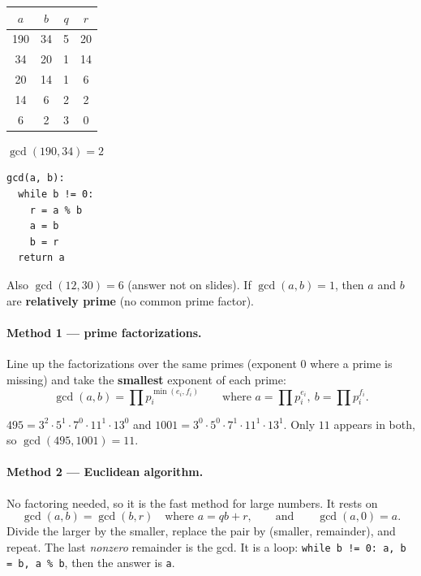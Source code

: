 \documentclass{fkt-notes}
\theoremstyle{definition}
\begin{document}
\begin{keybox}[title=Euclidean algorithm]
  \begin{minipage}[t]{0.52\linewidth}
    \begin{tabular}[t]{@{}cccc@{}}
      \toprule
      $a$ & $b$ & $q$ & $r$ \\\midrule
      190 & 34  & 5   & 20  \\
      34  & 20  & 1   & 14  \\
      20  & 14  & 1   & 6   \\
      14  & 6   & 2   & 2   \\
      6   & 2   & 3   & 0   \\\bottomrule
    \end{tabular}
    \quad $\gcd(190,34)=2$
  \end{minipage}\hfill
  \begin{minipage}[t]{0.40\linewidth}
    \begin{lstlisting}[numbers=none,frame=none]
gcd(a, b):
  while b != 0:
    r = a % b
    a = b
    b = r
  return a
\end{lstlisting}
  \end{minipage}
\end{keybox}
Also $\gcd(12,30)=6$ (answer not on slides).
If $\gcd(a,b)=1$, then $a$ and $b$ are \textbf{relatively prime} (no common prime factor).%

\paragraph{Method 1 --- prime factorizations.} Line up the factorizations
over the same primes (exponent $0$ where a prime is missing) and take the
\textbf{smallest} exponent of each prime:
\[
  \gcd(a, b) = \prod p_i^{\min(e_i, f_i)}
  \qquad \text{where } a = \prod p_i^{e_i},\ b = \prod p_i^{f_i}.
\]

\begin{example}
  $495 = 3^2 \cdot 5^1 \cdot 7^0 \cdot 11^1 \cdot 13^0$ and
  $1001 = 3^0 \cdot 5^0 \cdot 7^1 \cdot 11^1 \cdot 13^1$.
  Only $11$ appears in both, so $\gcd(495, 1001) = 11$.
\end{example}

\paragraph{Method 2 --- Euclidean algorithm.} No factoring needed, so it
is the fast method for large numbers. It rests on
\[
  \gcd(a, b) = \gcd(b, r) \quad \text{where } a = qb + r,
  \qquad \text{and} \qquad \gcd(a, 0) = a.
\]
Divide the larger by the smaller, replace the pair by (smaller,
remainder), and repeat. The last \emph{nonzero} remainder is the gcd. It
is a loop:
\texttt{while b != 0: a, b = b, a \% b}, then the answer is \texttt{a}.
\end{document}
